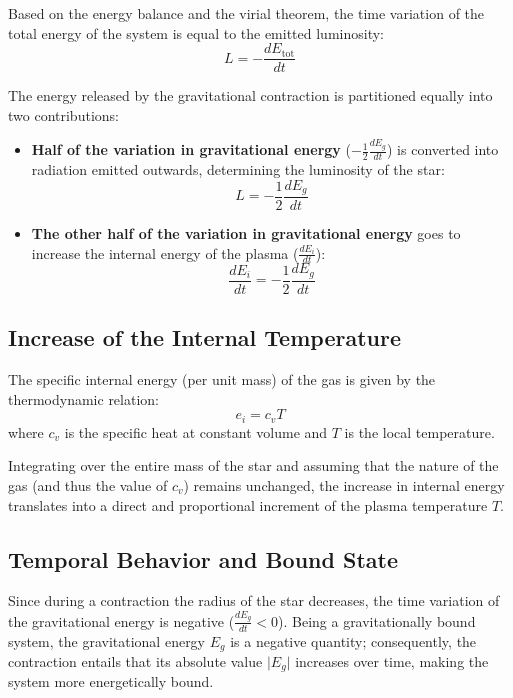 Based on the energy balance and the virial theorem, the time variation of the total energy of the system is equal to the emitted luminosity:
\begin{equation}
L = -\frac{dE_{\text{tot}}}{dt}
\end{equation}

The energy released by the gravitational contraction is partitioned equally into two contributions:
\begin{itemize}
\item \textbf{Half of the variation in gravitational energy} ($-\frac{1}{2} \frac{dE_g}{dt}$) is converted into radiation emitted outwards, determining the luminosity of the star:
\begin{equation}
L = -\frac{1}{2} \frac{dE_g}{dt}
\end{equation}
\item \textbf{The other half of the variation in gravitational energy} goes to increase the internal energy of the plasma ($\frac{dE_i}{dt}$):
\begin{equation}
\frac{dE_i}{dt} = -\frac{1}{2} \frac{dE_g}{dt}
\end{equation}
\end{itemize}

\subsection{Increase of the Internal Temperature}
The specific internal energy (per unit mass) of the gas is given by the thermodynamic relation:
\begin{equation}
e_i = c_v T
\end{equation}
where $c_v$ is the specific heat at constant volume and $T$ is the local temperature.

Integrating over the entire mass of the star and assuming that the nature of the gas (and thus the value of $c_v$) remains unchanged, the increase in internal energy translates into a direct and proportional increment of the plasma temperature $T$.

\subsection{Temporal Behavior and Bound State}
Since during a contraction the radius of the star decreases, the time variation of the gravitational energy is negative ($\frac{dE_g}{dt} < 0$). Being a gravitationally bound system, the gravitational energy $E_g$ is a negative quantity; consequently, the contraction entails that its absolute value $\vert{}E_g\vert{}$ increases over time, making the system more energetically bound.

